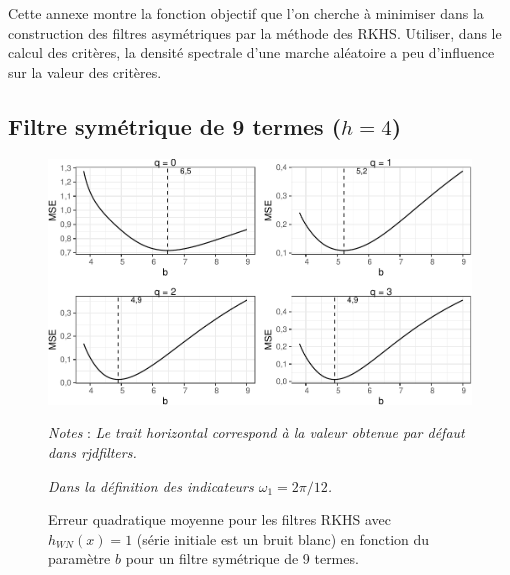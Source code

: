\documentclass[
  11pt,
  french,
  a4paper]{article}
\newcommand\1{\mathds{1}}
\begin{document}
Cette annexe montre la fonction objectif que l'on cherche à minimiser dans la construction des filtres asymétriques par la méthode des RKHS.
Utiliser, dans le calcul des critères, la densité spectrale d'une marche aléatoire a peu d'influence sur la valeur des critères.

\hypertarget{filtre-symuxe9trique-de-9-termes-h4}{%
\subsection{\texorpdfstring{Filtre symétrique de 9 termes (\(h=4\))}{Filtre symétrique de 9 termes (h=4)}}\label{filtre-symuxe9trique-de-9-termes-h4}}

\begin{figure}[H]

{\centering \includegraphics{img/bookdown/pdf/rkhsoptimse4wn-1} 

}

\caption[Erreur quadratique moyenne pour les filtres RKHS avec \(h_{WN}(x)=1\) (série initiale est un bruit blanc) en fonction du paramètre \(b\) pour un filtre symétrique de 9 termes]{Erreur quadratique moyenne pour les filtres RKHS avec \(h_{WN}(x)=1\) (série initiale est un bruit blanc) en fonction du paramètre \(b\) pour un filtre symétrique de 9 termes.}\label{fig:rkhsoptimse4wn}

\footnotesize


\emph{Notes} : \emph{Le trait horizontal correspond à la valeur obtenue par défaut dans rjdfilters.}

\emph{Dans la définition des indicateurs \(\omega_1=2\pi/12\).}
\normalsize\end{figure}
\end{document}
